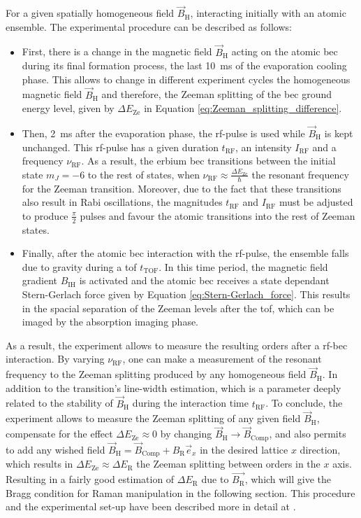 For a given spatially homogeneous field $\vec{B}_\text{H}$, interacting initially with an atomic ensemble. The experimental procedure can be described as follows:
\begin{itemize}
	\item First, there is a change in the magnetic field $\vec{B}_\text{H}$ acting on the atomic \ac{bec} during its final formation process, the last \SI{10}{\milli\second} of the evaporation cooling phase. This allows to change in different experiment cycles the homogeneous magnetic field $\vec{B}_\text{H}$ and therefore, the Zeeman splitting of the \ac{bec} ground energy level, given by $\Delta E_\text{Ze}$ in Equation \eqref{eq:Zeeman_splitting_difference}.
	\item Then, \SI{2}{\milli\second} after the evaporation phase, the \ac{rf}-pulse is used while $\vec{B}_\text{H}$ is kept unchanged. This \ac{rf}-pulse has a given duration $t_\text{RF}$, an intensity $I_\text{RF}$ and a frequency $\nu_\text{RF}$. As a result, the erbium \ac{bec} transitions between the initial state $m_J=-6$ to the rest of states, when $\nu_\text{RF}\approx\frac{\Delta E_\text{Ze}}{\hbar}$ the resonant frequency for the Zeeman transition. Moreover, due to the fact that these transitions also result in Rabi oscillations, the magnitudes $t_\text{RF}$ and $I_\text{RF}$ must be adjusted to produce $\frac{\pi}{2}$ pulses and favour the atomic transitions into the rest of Zeeman states.
	\item Finally, after the atomic \ac{bec} interaction with the \ac{rf}-pulse, the ensemble falls due to gravity during a \acl{tof} $t_\text{TOF}$. In this time period, the magnetic field gradient $B_\text{IH}$ is activated and the atomic \ac{bec} receives a state dependant Stern-Gerlach force given by Equation \eqref{eq:Stern-Gerlach_force}. This results in the spacial separation of the Zeeman levels after the \ac{tof}, which can be imaged by the absorption imaging phase.
\end{itemize}

As a result, the experiment allows to measure the resulting orders after a \ac{rf}-\ac{bec} interaction. By varying $\nu_\text{RF}$, one can make a measurement of the resonant frequency to the Zeeman splitting produced by any homogeneous field $\vec{B}_\text{H}$. In addition to the transition's line-width estimation, which is a parameter deeply related to the stability of $\vec{B}_\text{H}$ during the interaction time $t_\text{RF}$. To conclude, the experiment allows to measure the Zeeman splitting of any given field $\vec{B}_\text{H}$, compensate for the effect $\Delta E_\text{Ze}\approx0$ by changing $\vec{B}_\text{H}\rightarrow \vec{B}_\text{Comp}$, and also permits to add any wished field $\vec{B}_\text{H} = \vec{B}_\text{Comp} + B_{\text{R}} \vec{e}_x$ in the desired lattice $x$ direction, which results in $\Delta E_\text{Ze}\approx\Delta E_\text{R}$ the Zeeman splitting between orders in the $x$ axis. Resulting in a fairly good estimation of $\Delta E_\text{R}$ due to $\vec{B_{\text{R}}}$, which will give the Bragg condition for Raman manipulation in the following section. This procedure and the experimental set-up have been described more in detail at \cite{Ulitzsch2016}.

